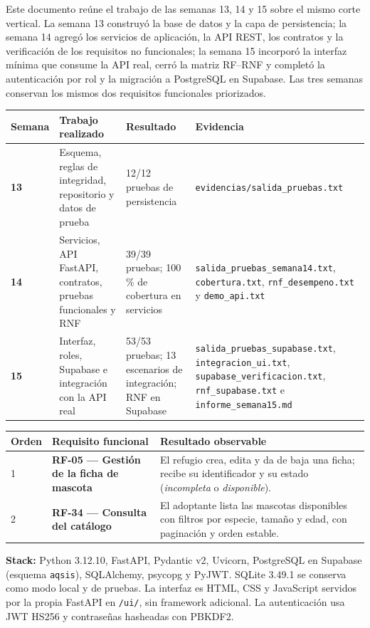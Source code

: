 \documentclass[11pt,a4paper]{article}
\newcommand{\code}[1]{\texttt{#1}}
\newcommand{\thead}[1]{\textbf{#1}}
\begin{document}
Este documento reúne el trabajo de las semanas 13, 14 y 15 sobre el mismo corte
vertical. La semana 13 construyó la base de datos y la capa de persistencia; la
semana 14 agregó los servicios de aplicación, la API REST, los contratos y la
verificación de los requisitos no funcionales; la semana 15 incorporó la interfaz
mínima que consume la API real, cerró la matriz RF--RNF y completó la
autenticación por rol y la migración a PostgreSQL en Supabase. Las tres semanas
conservan los mismos dos requisitos funcionales priorizados.

{\footnotesize
\begin{tabularx}{\linewidth}{@{}V{0.35}V{1.0}V{1.0}V{1.65}@{}}
\toprule
\thead{Semana} & \thead{Trabajo realizado} & \thead{Resultado} & \thead{Evidencia} \\ \midrule
\textbf{13} & Esquema, reglas de integridad, repositorio y datos de prueba &
12/12 pruebas de persistencia & \code{evidencias/salida\_pruebas.txt} \\
\textbf{14} & Servicios, API FastAPI, contratos, pruebas funcionales y RNF &
39/39 pruebas; 100\,\% de cobertura en servicios &
\code{salida\_pruebas\_semana14.txt}, \code{cobertura.txt},
\code{rnf\_desempeno.txt} y \code{demo\_api.txt} \\
\textbf{15} & Interfaz, roles, Supabase e integración con la API real &
53/53 pruebas; 13 escenarios de integración; RNF en Supabase &
\code{salida\_pruebas\_supabase.txt}, \code{integracion\_ui.txt},
\code{supabase\_verificacion.txt}, \code{rnf\_supabase.txt} e
\code{informe\_semana15.md} \\
\bottomrule
\end{tabularx}
}

\vspace{1mm}
{\footnotesize
\begin{tabularx}{\linewidth}{@{}V{0.3}V{1.2}V{1.5}@{}}
\toprule
\thead{Orden} & \thead{Requisito funcional} & \thead{Resultado observable} \\  & \textbf{RF-05 --- Gestión de la ficha de mascota} &
El refugio crea, edita y da de baja una ficha; recibe su identificador y su
estado (\emph{incompleta} o \emph{disponible}). \\
2 & \textbf{RF-34 --- Consulta del catálogo} &
El adoptante lista las mascotas disponibles con filtros por especie, tamaño y
edad, con paginación y orden estable. \\
\bottomrule
\end{tabularx}
}

\textbf{Stack:} Python 3.12.10, FastAPI, Pydantic v2, Uvicorn, PostgreSQL en
Supabase (esquema \code{aqsis}), SQLAlchemy, psycopg y PyJWT. SQLite 3.49.1 se
conserva como modo local y de pruebas. La interfaz es HTML, CSS y JavaScript
servidos por la propia FastAPI en \code{/ui/}, sin framework adicional. La
autenticación usa JWT HS256 y contraseñas hasheadas con PBKDF2.
\end{document}
